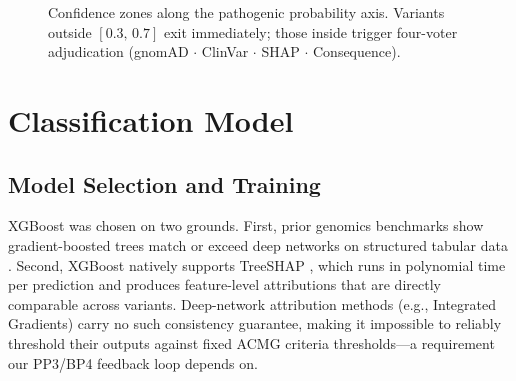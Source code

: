 \documentclass[12pt,a4paper]{article}
\begin{document}
\begin{figure}[H]
\centering
{}
\caption{Confidence zones along the pathogenic probability axis.
         Variants outside $[0.3,\,0.7]$ exit immediately; those
         inside trigger four-voter adjudication
         (gnomAD $\cdot$ ClinVar $\cdot$ SHAP $\cdot$ Consequence).}
\label{fig:confzones}
\end{figure}

\section{Classification Model}

\subsection{Model Selection and Training}

XGBoost \cite{chen2016xgboost} was chosen on two grounds. First,
prior genomics benchmarks show gradient-boosted trees match or
exceed deep networks on structured tabular data \cite{parente2021}.
Second, XGBoost natively supports TreeSHAP \cite{lundberg2020trees},
which runs in polynomial time per prediction and produces
feature-level attributions that are directly comparable across
variants. Deep-network attribution methods (e.g., Integrated
Gradients) carry no such consistency guarantee, making it
impossible to reliably threshold their outputs against fixed ACMG
criteria thresholds---a requirement our PP3/BP4 feedback loop
depends on.
\end{document}
